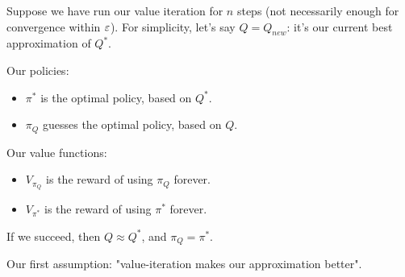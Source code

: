         \begin{notation}
            Suppose we have run our value iteration for $n$ steps (not necessarily enough for convergence within $\varepsilon$). For simplicity, let's say $Q=Q_{new}$: it's our current best approximation of $Q^*$.

            Our policies:

            \begin{itemize}
                \item $\pi^*$ is the optimal policy, based on $Q^*$.
                \item $\pi_Q$ guesses the optimal policy, based on $Q$.
            \end{itemize}

            Our value functions:

            \begin{itemize}
                \item $V_{\pi_Q}$ is the reward of using $\pi_Q$ forever.

                \item $V_{\pi^*}$ is the reward of using $\pi^*$ forever.
            \end{itemize}
        \end{notation}

        If we succeed, then $Q\approx Q^*$, and $\pi_Q = \pi^*$.

        \subsecdiv

        Our first assumption: "value-iteration makes our approximation better".\\

